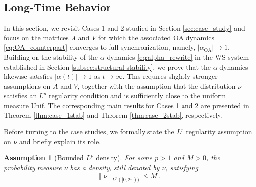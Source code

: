 \documentclass[10pt]{article}
\newtheorem{assumption}[theorem]{Assumption}
\theoremstyle{definition}
\theoremstyle{definition}
\numberwithin{equation}{section}
\newcommand{\Unif}{\mathrm{Unif}}
\newcommand{\OA}{\mathrm{OA}}
\begin{document}

\subsection{Long-Time Behavior}\label{subsec:LTB_beyond_OA}
In this section, we revisit Cases 1 and 2 studied in Section \ref{sec:case_study} and focus on the matrices $A$ and $V$ for which the associated OA dynamics \eqref{eq:OA_counterpart} converges to full synchronization, namely, $|\alpha_{\OA}| \rightarrow 1$.
Building on the stability of the $\alpha$-dynamics \eqref{eq:alpha_rewrite} in the WS system established in Section \ref{subsec:structural-stability}, we prove that the $\alpha$-dynamics likewise satisfies $|\alpha(t)| \rightarrow 1$ as $t \rightarrow \infty$.
This requires slightly stronger assumptions on $A$ and $V$, together with the assumption that the distribution $\nu$ satisfies an $L^p$ regularity condition and is sufficiently close to the uniform measure $\Unif$. 
The corresponding main results for Cases 1 and 2 are presented in Theorem \ref{thm:case_1stab} and Theorem \ref{thm:case_2stab}, respectively.

Before turning to the case studies, we formally state the $L^p$ regularity assumption on $\nu$ and briefly explain its role.

\begin{assumption}[Bounded $L^p$ density]\label{asm:Lp}
For some $p > 1$ and $M > 0$, 
the probability measure $\nu$ has a density, still denoted by $\nu$, satisfying
\begin{equation*}
\|\nu\|_{L^p([0,2\pi))} \leq M \, .
\end{equation*}
\end{assumption}
\end{document}

